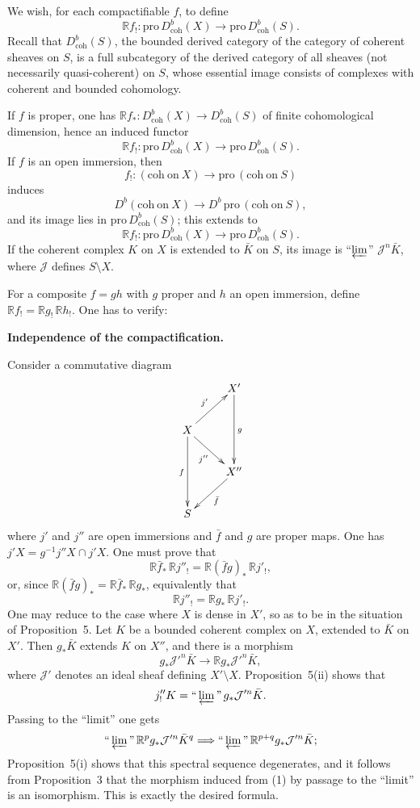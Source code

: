 \documentclass[11pt]{amsart}
\newcommand{\Pro}{\text{pro}\,}
\newcommand{\coh}{\text{coh}}
\newcommand{\cJ}{\mathcal{J}}
\newcommand{\cDb}{D^{b}}
\newcommand{\bR}{\mathbb{R}}
\theoremstyle{plain}
\theoremstyle{definition}
\begin{document}
We wish, for each compactifiable $f$, to define
\[
\bR f_!\colon \Pro\cDb_{\coh}(X)\to \Pro\cDb_{\coh}(S).
\]
Recall that $\cDb_{\coh}(S)$, the bounded derived category of the category of coherent sheaves on $S$, is a full subcategory of the derived category of all sheaves (not necessarily quasi-coherent) on $S$, whose essential image consists of complexes with coherent and bounded cohomology.

If $f$ is proper, one has $\bR f_*\colon \cDb_{\coh}(X)\to \cDb_{\coh}(S)$ of finite cohomological dimension, hence an induced functor
\[
\bR f_!\colon \Pro\cDb_{\coh}(X)\to \Pro\cDb_{\coh}(S).
\]
If $f$ is an open immersion, then
\[
f_!\colon (\mathrm{coh\ on\ }X)\to \Pro(\mathrm{coh\ on\ }S)
\]
induces
\[
\cDb(\mathrm{coh\ on\ }X)\to \cDb\,\Pro(\mathrm{coh\ on\ }S),
\]
and its image lies in $\Pro\cDb_{\coh}(S)$; this extends to
\[
\bR f_!\colon \Pro\cDb_{\coh}(X)\to \Pro\cDb_{\coh}(S).
\]
If the coherent complex $K$ on $X$ is extended to $\bar K$ on $S$, its image is ``$\varprojlim$'' $\cJ^n\bar K$, where $\cJ$ defines $S\setminus X$.

For a composite $f=gh$ with $g$ proper and $h$ an open immersion, define $\bR f_!=\bR g_!\,\bR h_!$. One has to verify:

\medskip
\noindent\textbf{Independence of the compactification.}

Consider a commutative diagram
\[
\xymatrix{
& X' \ar[dd]^g \\
X \ar[ur]^{j'} \ar[dr]_{j''} \ar[dd]_f & \\
& X'' \ar[dl]^{\bar f} \\
S &
}
\]
where $j'$ and $j''$ are open immersions and $\bar f$ and $g$ are proper maps. One has $j'X=g^{-1}j''X\cap j'X$. One must prove that
\[
\bR\bar f_*\,\bR j''_! = \bR(\bar f g)_*\,\bR j'_!,
\]
or, since $\bR(\bar f g)_*=\bR\bar f_*\,\bR g_*$, equivalently that
\[
\bR j''_!=\bR g_*\,\bR j'_!.
\]
One may reduce to the case where $X$ is dense in $X'$, so as to be in the situation of Proposition~5. Let $K$ be a bounded coherent complex on $X$, extended to $\bar K$ on $X'$. Then $g_*\bar K$ extends $K$ on $X''$, and there is a morphism
\begin{equation}
g_*\cJ'^n\bar K\to \bR g_*\cJ'^n\bar K,
\end{equation}
where $\cJ'$ denotes an ideal sheaf defining $X'\setminus X$. Proposition~5(ii) shows that
\[
j''_!K=\text{``}\varprojlim\text{''}\, g_*\cJ'^n\bar K.
\]
Passing to the ``limit'' one gets
\[
\text{``}\varprojlim\text{''}\,\bR^p g_*\cJ'^n\bar K^q \Longrightarrow \text{``}\varprojlim\text{''}\,\bR^{p+q}g_*\cJ'^n\bar K;
\]
Proposition~5(i) shows that this spectral sequence degenerates, and it follows from Proposition~3 that the morphism induced from (1) by passage to the ``limit'' is an isomorphism. This is exactly the desired formula.
\end{document}
